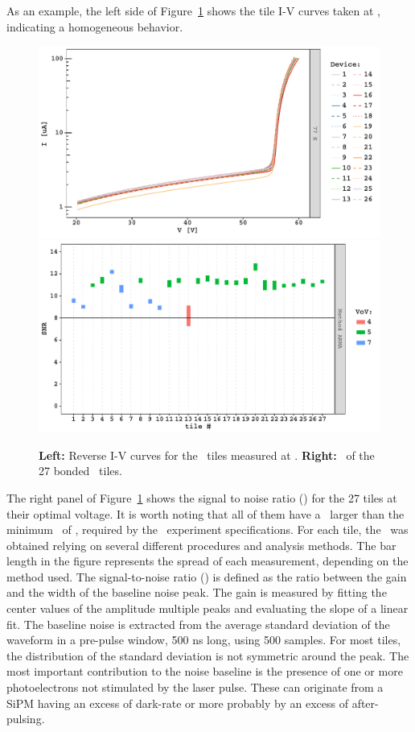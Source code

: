 As an example, the left side of Figure~\ref{fig:I-V-SNR} shows the tile I-V curves taken at \LINNormalTemperature, indicating a homogeneous behavior.  

\begin{figure} [t]
\includegraphics[width=0.49\columnwidth]{./Figures/IV_77K.pdf}
\includegraphics[width=0.49\columnwidth]{./Figures/SNR.pdf}
\caption[\SiPM\ $I$-$V$ curves and \SNR]{{\bf Left:} Reverse I-V curves for the \SiPM\ tiles measured at \LINNormalTemperature.  {\bf Right:} \SNR\ of the \num{27} bonded \SiPM\ tiles.}
\label{fig:I-V-SNR} 
\end{figure} 


The right panel of Figure~\ref{fig:I-V-SNR} shows the signal to noise ratio (\SNR) for the 27 tiles at their optimal voltage.  It is worth noting that all of them have a \SNR\ larger than the minimum \SNR\ of \DSkTileChargeSNRSpecification, required by the \DSk\ experiment specifications. For each tile, the \SNR\ was obtained relying on several different procedures and analysis methods.  The bar length in the figure represents the spread of each measurement, depending on the method used.  The signal-to-noise ratio (\SNR) is defined as the ratio between the gain and the width of the baseline noise peak. The gain is measured by fitting the center values of the amplitude multiple peaks and evaluating the slope of a linear fit. The baseline noise is extracted from the average standard deviation of the waveform in a pre-pulse window, 500 ns long, using 500 samples. For most tiles, the distribution of the standard deviation is not symmetric around the peak.  The most important contribution to the noise baseline is the presence of one or more photoelectrons not stimulated by the laser pulse. These can originate from a SiPM having an excess of dark-rate or more probably by an excess of after-pulsing.

